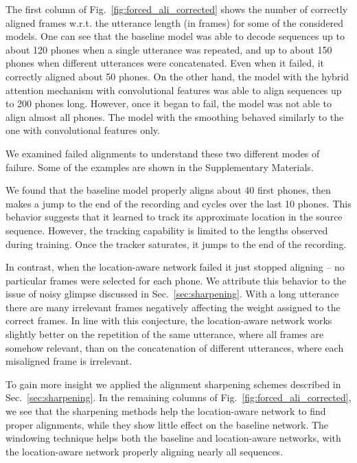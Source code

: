 \documentclass{article} %
\begin{document}
The first column of Fig.~\ref{fig:forced_ali_corrected} shows the number of
correctly aligned frames w.r.t. the utterance length (in frames) for some of the
considered models. One can see that the baseline model was able to decode
sequences up to about 120 phones when a single utterance was repeated, and up to
about 150 phones when different utterances were concatenated. Even when it
failed, it correctly aligned about 50 phones. On the other hand, the model with
the hybrid attention mechanism with convolutional features was able to align
sequences up to 200 phones long. However, once it began to fail, the model was
not able to align almost all phones. The model with the smoothing behaved
similarly to the one with convolutional features only.

We examined failed alignments to understand these two different modes of
failure. Some of the examples are shown in the Supplementary Materials.

We found that the baseline model properly aligns about 40 first phones, then
makes a jump to the end of the recording and cycles over the last 10 phones.
This behavior suggests that it learned to track its approximate location in the
source sequence. However, the tracking capability is limited to the lengths
observed during training. Once the tracker saturates, it jumps to the end of the
recording.

In contrast, when the location-aware network failed it just stopped aligning --
no particular frames were selected for each phone.  We attribute this behavior
to the issue of noisy glimpse discussed in Sec.~\ref{sec:sharpening}. With a
long utterance there are many 
irrelevant frames negatively affecting the weight assigned to the correct
frames. In line with this conjecture, the location-aware network works slightly
better on the repetition of the same utterance, where all frames are somehow
relevant, than on the concatenation of different utterances, where each
misaligned frame is irrelevant. %

To gain more insight 
we applied the alignment sharpening schemes described in
Sec.~\ref{sec:sharpening}. In the remaining columns of
Fig.~\ref{fig:forced_ali_corrected}, we see that the sharpening
methods help the location-aware network to find proper alignments, while they
show little effect on the baseline network. 
The windowing technique helps both the baseline and location-aware networks,
with the location-aware network properly aligning nearly all sequences. 
\end{document}
